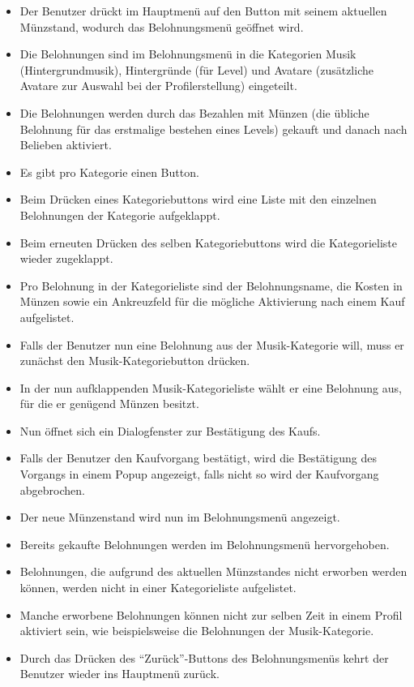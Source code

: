 \begin{itemize}
	\item Der Benutzer drückt im Hauptmenü auf den Button mit seinem aktuellen Münzstand, wodurch das Belohnungsmenü geöffnet wird.
	\item Die Belohnungen sind im Belohnungsmenü in die Kategorien Musik (Hintergrundmusik), Hintergründe (für Level) und Avatare (zusätzliche Avatare zur Auswahl bei der Profilerstellung) eingeteilt.
	\item Die Belohnungen werden durch das Bezahlen mit Münzen (die übliche Belohnung für das erstmalige bestehen eines Levels) gekauft und danach nach Belieben aktiviert.
	\item Es gibt pro Kategorie einen Button.
	\item Beim Drücken eines Kategoriebuttons wird eine Liste mit den einzelnen Belohnungen der Kategorie aufgeklappt.
	\item Beim erneuten Drücken des selben Kategoriebuttons wird die Kategorieliste wieder zugeklappt.
	\item Pro Belohnung in der Kategorieliste sind der Belohnungsname, die Kosten in Münzen sowie ein Ankreuzfeld für die mögliche Aktivierung nach einem Kauf aufgelistet.
	\item Falls der Benutzer nun eine Belohnung aus der Musik-Kategorie will, muss er zunächst den Musik-Kategoriebutton drücken.
	\item In der nun aufklappenden Musik-Kategorieliste wählt er eine Belohnung aus, für die er genügend Münzen besitzt.
	\item Nun öffnet sich ein Dialogfenster zur Bestätigung des Kaufs.
	\item Falls der Benutzer den Kaufvorgang bestätigt, wird die Bestätigung des Vorgangs in einem Popup angezeigt, falls nicht so wird der Kaufvorgang abgebrochen.
	\item Der neue Münzenstand wird nun im Belohnungsmenü angezeigt.
	\item Bereits gekaufte Belohnungen werden im Belohnungsmenü hervorgehoben.
	\item Belohnungen, die aufgrund des aktuellen Münzstandes nicht erworben werden können, werden nicht in einer Kategorieliste aufgelistet.
	\item Manche erworbene Belohnungen können nicht zur selben Zeit in einem Profil aktiviert sein, wie beispielsweise die Belohnungen der Musik-Kategorie.
	\item Durch das Drücken des "`Zurück"'-Buttons des Belohnungsmenüs kehrt der Benutzer wieder ins Hauptmenü zurück.
\end{itemize}

